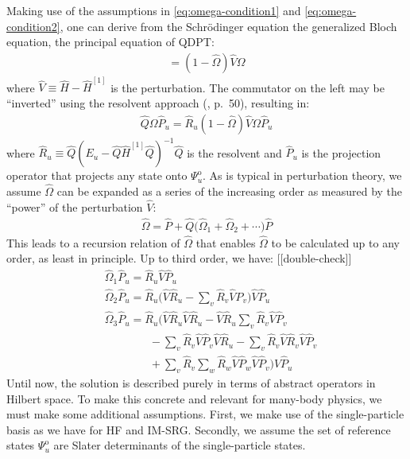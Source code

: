 Making use of the assumptions in  \eqref{eq:omega-condition1} and \eqref{eq:omega-condition2}, one can derive from the Schr\"odinger equation the generalized Bloch equation, the principal equation of QDPT:
\begin{gather*}
  [\hat \Omega, \hat{H}^{[1]}] =
  (1 - \hat \Omega) \hat V \Omega
\end{gather*}
where $\hat V \equiv \hat H - \hat{H}^{[1]}$ is the perturbation.  The
commutator on the left may be ``inverted'' using the resolvent approach
(\cite{shavitt2009many}, p.\ 50), resulting in:
\begin{align*}
  \hat Q \Omega \hat P_u =
  \hat R_u (1 - \hat \Omega) \hat V \Omega \hat P_u
\end{align*}
where $\hat R_u \equiv \hat Q (E_u - \hat Q \hat{H}^{[1]} \hat Q)^{-1} \hat Q$ is the resolvent and $\hat P_u$ is the projection operator that projects any state onto $\Psi^{\mathrm{o}}_u$.  As is typical in perturbation theory, we assume $\hat \Omega$ can be expanded as a series of the increasing order as measured by the ``power'' of the perturbation $\hat V$:
\begin{align*}
  \hat \Omega = \hat P +
  \hat Q\bigl(\hat \Omega_1 + \hat \Omega_2 + \cdots\bigr) \hat P
\end{align*}
This leads to a recursion relation of $\hat \Omega$ that enables $\hat \Omega$ to be calculated up to any order, as least in principle.  Up to third order, we have: [[double-check]]
\begin{align*}
  &\hat \Omega_1 \hat P_u = \hat R_u \hat V \hat P_u \\
  &\hat \Omega_2 \hat P_u =
    \hat R_u \biggl(
    \hat V \hat R_u
    - \sum_v \hat R_v \hat V \hat P_v
    \biggr) \hat V \hat P_u \\
  &\hat \Omega_3 \hat P_u =
    \hat R_u \biggl(
    \hat V \hat R_u \hat V \hat R_u
    - \hat V \hat R_u \sum_v \hat R_v \hat V \hat P_v \\
  &\qquad\qquad
    - \sum_v \hat R_v \hat V \hat P_v \hat V \hat R_u
    - \sum_v \hat R_v \hat V \hat R_v \hat V \hat P_v \\
  &\qquad\qquad
    + \sum_v \hat R_v \sum_w \hat R_w \hat V \hat P_w \hat V \hat P_v
    \biggr) \hat V \hat P_u
\end{align*}
Until now, the solution is described purely in terms of abstract operators in Hilbert space.  To make this concrete and relevant for many-body physics, we must make some additional assumptions.  First, we make use of the single-particle basis as we have for HF and IM-SRG.  Secondly, we assume the set of reference states $\Psi^{\mathrm{o}}_u$ are Slater determinants of the single-particle states.

